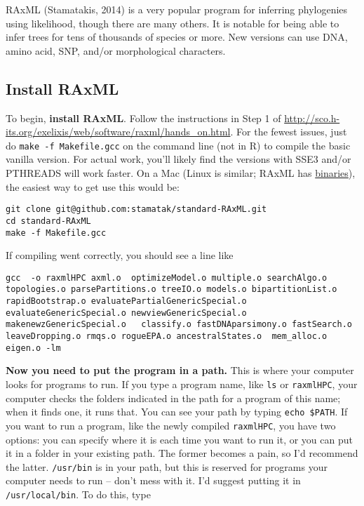 \documentclass[
]{article}
\begin{document}
RAxML (Stamatakis, 2014) is a very popular program for inferring phylogenies using likelihood, though there are many others. It is notable for being able to infer trees for tens of thousands of species or more. New versions can use DNA, amino acid, SNP, and/or morphological characters.

\hypertarget{install-raxml}{%
\subsection{Install RAxML}\label{install-raxml}}

To begin, \textbf{install RAxML}. Follow the instructions in Step 1 of \url{http://sco.h-its.org/exelixis/web/software/raxml/hands_on.html}. For the fewest issues, just do \texttt{make\ -f\ Makefile.gcc} on the command line (not in R) to compile the basic vanilla version. For actual work, you'll likely find the versions with SSE3 and/or PTHREADS will work faster. On a Mac (Linux is similar; RAxML has \href{https://github.com/stamatak/standard-RAxML/tree/master/WindowsExecutables_v8.2.4}{binaries}), the easiest way to get use this would be:

\begin{verbatim}
git clone git@github.com:stamatak/standard-RAxML.git
cd standard-RAxML
make -f Makefile.gcc
\end{verbatim}

If compiling went correctly, you should see a line like

\begin{verbatim}
gcc  -o raxmlHPC axml.o  optimizeModel.o multiple.o searchAlgo.o topologies.o parsePartitions.o treeIO.o models.o bipartitionList.o rapidBootstrap.o evaluatePartialGenericSpecial.o evaluateGenericSpecial.o newviewGenericSpecial.o makenewzGenericSpecial.o   classify.o fastDNAparsimony.o fastSearch.o leaveDropping.o rmqs.o rogueEPA.o ancestralStates.o  mem_alloc.o  eigen.o -lm
\end{verbatim}

\textbf{Now you need to put the program in a path.} This is where your computer looks for programs to run. If you type a program name, like \texttt{ls} or \texttt{raxmlHPC}, your computer checks the folders indicated in the path for a program of this name; when it finds one, it runs that. You can see your path by typing \texttt{echo\ \$PATH}. If you want to run a program, like the newly compiled \texttt{raxmlHPC}, you have two options: you can specify where it is each time you want to run it, or you can put it in a folder in your existing path. The former becomes a pain, so I'd recommend the latter. \texttt{/usr/bin} is in your path, but this is reserved for programs your computer needs to run -- don't mess with it. I'd suggest putting it in \texttt{/usr/local/bin}. To do this, type
\end{document}
